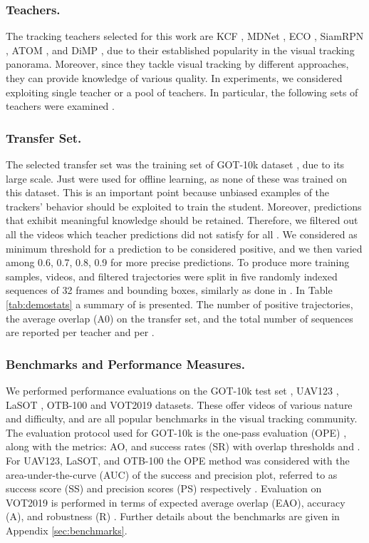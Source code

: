 \documentclass[runningheads]{llncs}
\begin{document}
\subsubsection{Teachers.}
The tracking teachers selected for this work are KCF \cite{KCF}, MDNet \cite{MDNet}, ECO \cite{ECO}, SiamRPN \cite{SiamRPN}, ATOM \cite{ATOM}, and DiMP \cite{DiMP}, due to their established popularity in the visual tracking panorama. Moreover, since they tackle visual tracking by different approaches, they can provide knowledge of various quality. 
In experiments, we considered exploiting single teacher or a pool of teachers. In particular, the following sets of teachers were examined . 


\subsubsection{Transfer Set.}
The selected transfer set was the training set of GOT-10k dataset \cite{GOT10k}, due to its large scale. 
Just  were used for offline learning, as none of these was trained on this dataset. This is an important point because unbiased examples of the trackers' behavior should be exploited to train the student.
Moreover, predictions that exhibit meaningful knowledge should be retained. Therefore, we filtered out all the videos  which teacher predictions did not satisfy   for all . We considered  as minimum threshold for a prediction to be considered positive, and we then varied  among 0.6, 0.7, 0.8, 0.9 for more precise predictions.
To produce more training samples, videos, and filtered trajectories were split in five randomly indexed sequences of 32 frames and bounding boxes, similarly as done in \cite{RE3}.
In Table \ref{tab:demostats} a summary of  is presented. The number of positive trajectories, the average overlap (A0) \cite{GOT10k} on the transfer set, and the total number of sequences  are reported per teacher and per .

\subsubsection{Benchmarks and Performance Measures.}
We performed performance evaluations on the GOT-10k test set \cite{GOT10k}, UAV123 \cite{UAV123}, LaSOT \cite{LaSOT}, OTB-100 \cite{OTB} and VOT2019 \cite{VOT2019} datasets. These offer videos of various nature and difficulty, and are all popular benchmarks in the visual tracking community.
The evaluation protocol used for GOT-10k is the one-pass evaluation (OPE) \cite{OTB}, along with the metrics: AO, and success rates (SR) with overlap thresholds  and . For UAV123, LaSOT, and OTB-100 the OPE method was considered with the area-under-the-curve (AUC) of the success and precision plot, referred to as success score (SS) and precision scores (PS) respectively \cite{OTB}. Evaluation on VOT2019 is performed in terms of expected average overlap (EAO), accuracy (A), and robustness (R) \cite{VOT}.
Further details about the benchmarks are given in Appendix \ref{sec:benchmarks}.
\end{document}
